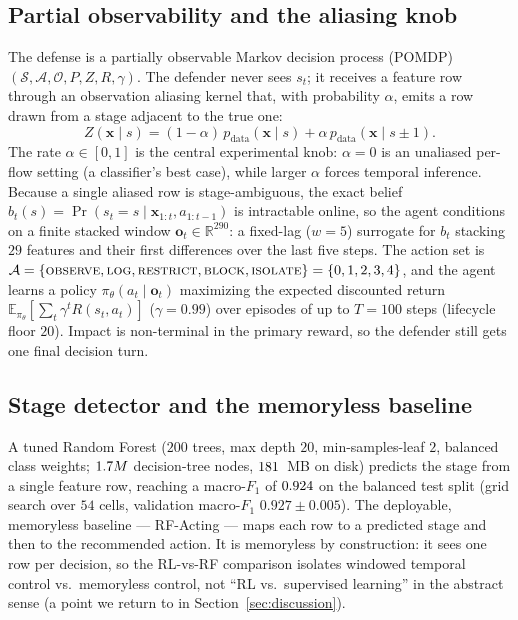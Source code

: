 \documentclass[3p,twocolumn]{elsarticle}
\begin{document}
\subsection{Partial observability and the aliasing knob}
\label{sec:pomdp}
The defense is a partially observable Markov decision process (POMDP)
$(\mathcal{S},\mathcal{A},\mathcal{O},P,Z,R,\gamma)$.
The defender never sees $s_t$; it receives a feature row through an
observation aliasing kernel that, with probability $\alpha$, emits a row
drawn from a stage adjacent to the true one:
\begin{equation}
Z(\mathbf{x}\mid s) = (1-\alpha)\,p_{\text{data}}(\mathbf{x}\mid s)
           + \alpha\,p_{\text{data}}(\mathbf{x}\mid s\pm 1).
\label{eq:aliasing}
\end{equation}
The rate $\alpha\in[0,1]$ is the central experimental knob: $\alpha=0$ is an
unaliased per-flow setting (a classifier's best case), while larger
$\alpha$ forces temporal inference. Because a single aliased row is
stage-ambiguous, the exact belief
$b_t(s)=\Pr(s_t=s\mid \mathbf{x}_{1:t},a_{1:t-1})$ is intractable online, so the
agent conditions on a finite stacked window $\mathbf{o}_t\in\mathbb{R}^{290}$: a
fixed-lag ($w=5$) surrogate for $b_t$ stacking $29$ features and their first
differences over the last five steps. The action set is
$\mathcal{A}=\{\textsc{observe}, \textsc{log}, \textsc{restrict},
\textsc{block}, \textsc{isolate}\}=\{0,1,2,3,4\}$, and the agent learns a
policy $\pi_\theta(a_t\mid\mathbf{o}_t)$ maximizing the expected discounted
return $\mathbb{E}_{\pi_\theta}[\sum_t \gamma^{t} R(s_t,a_t)]$ ($\gamma=0.99$)
over episodes of up to $T=100$ steps (lifecycle floor $20$). Impact is
non-terminal in the primary reward, so the defender still gets one final
decision turn.

\subsection{Stage detector and the memoryless baseline}
\label{sec:detector}
A tuned Random Forest ($200$ trees, max depth $20$, min-samples-leaf $2$,
balanced class weights; $1.7M$ decision-tree nodes,
$181$~MB on disk) predicts the stage
from a single feature row, reaching a macro-$F_1$ of $0.924$
on the balanced test split (grid search over $54$ cells,
validation macro-$F_1$ $0.927\pm0.005$). The deployable, memoryless
baseline --- RF-Acting --- maps each row to a predicted stage and then
to the recommended action. It is memoryless by construction: it sees one
row per decision, so the RL-vs-RF comparison isolates windowed temporal
control vs.\ memoryless control, not ``RL vs.\ supervised learning'' in the
abstract sense (a point we return to in Section~\ref{sec:discussion}).
\end{document}
